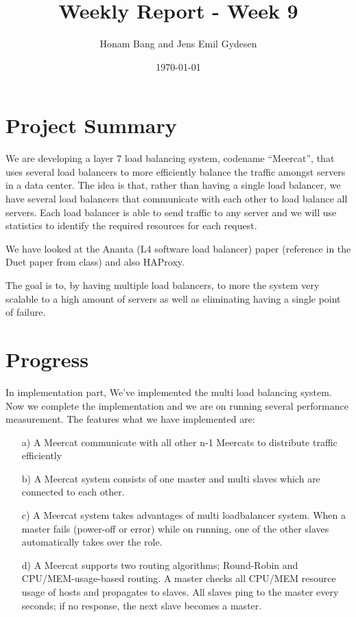 \documentclass[11pt,letter]{article}
\author{Honam Bang and Jens Emil Gydesen}
\date{\today}
\title{Weekly Report - Week 9}
\begin{document}
\maketitle
\section{Project Summary}
We are developing a layer 7 load balancing system, codename ``Meercat'', that uses several load balancers to more efficiently balance the traffic amongst servers in a data center. The idea is that, rather than having a single load balancer, we have several load balancers that communicate with each other to load balance all servers. Each load balancer is able to send traffic to any server and we will use statistics to identify the required resources for each request.

We have looked at the Ananta (L4 software load balancer) paper (reference in the Duet paper from class)\cite{ananta} and also HAProxy\cite{haproxy}.

The goal is to, by having multiple load balancers, to more the system very scalable to a high amount of servers as well as eliminating having a single point of failure. 

\section{Progress}
In implementation part, We've implemented the multi load balancing system. Now we complete the implementation and we are on running several performance measurement. The features what we have implemented are:
\begin{enumerate}
	\item[a)] A Meercat communicate with all other n-1 Meercats to distribute traffic efficiently
	\item[b)]  A Meercat system consists of one master and multi slaves which are connected to each other.
	\item[c)]  A Meercat system takes advantages of multi loadbalancer system. When a master fails (power-off or error) while on running, one of the other slaves automatically takes over the role.
	\item[d)] A Meercat supports two routing algorithms; Round-Robin and CPU/MEM-usage-based routing. A master checks all CPU/MEM resource usage of hosts and propagates to slaves. All slaves ping to the master every seconds; if no response, the next slave becomes a master.
\end{enumerate}
\end{document}
